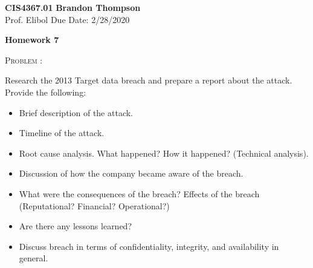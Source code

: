 \documentclass[12pt]{article}
\newenvironment{problem}[1]
{\begin{mdframed}[linewidth=0.8pt]
        \textsc{Problem #1:}

}
    {\end{mdframed}}
\begin{document}
\noindent
\textbf{CIS4367.01} \hfill \textbf{Brandon Thompson} \\
\normalsize Prof. Elibol \hfill Due Date: 2/28/2020 \\

\begin{center}
\textbf{Homework 7}
\end{center}
	\begin{problem}{}
		Research the 2013 Target data breach and prepare a report about the attack.
		Provide the following:
		\begin{itemize}
			\item Brief description of the attack.
			\item Timeline of the attack.
			\item Root cause analysis. What happened? How it happened? (Technical analysis).
			\item Discussion of how the company became aware of the breach.
			\item What were the consequences of the breach? Effects of the breach (Reputational? Financial? Operational?)
			\item Are there any lessons learned?
			\item Discuss breach in terms of confidentiality, integrity, and availability in general.
		\end{itemize}
	\end{problem}
\end{document}
